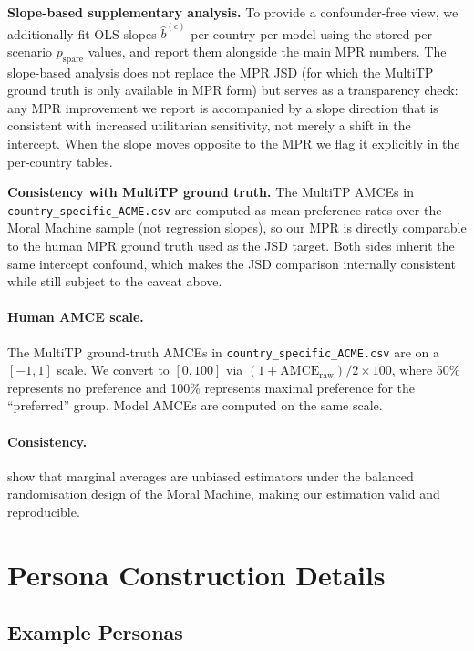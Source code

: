 \documentclass{article}
\begin{document}
\textbf{Slope-based supplementary analysis.}
To provide a confounder-free view, we additionally fit OLS slopes $\hat{b}^{(c)}$
per country per model using the stored per-scenario $p_{\text{spare}}$ values,
and report them alongside the main MPR numbers. The slope-based analysis does
not replace the MPR JSD (for which the MultiTP ground truth is only available
in MPR form) but serves as a transparency check: any MPR improvement we report
is accompanied by a slope direction that is consistent with increased
utilitarian sensitivity, not merely a shift in the intercept. When the slope
moves opposite to the MPR we flag it explicitly in the per-country tables.

\textbf{Consistency with MultiTP ground truth.} The MultiTP AMCEs in
\texttt{country\_specific\_ACME.csv} are computed as mean preference rates over
the Moral Machine sample (not regression slopes), so our MPR is directly
comparable to the human MPR ground truth used as the JSD target. Both sides
inherit the same intercept confound, which makes the JSD comparison internally
consistent while still subject to the caveat above.

\paragraph{Human AMCE scale.} The MultiTP ground-truth AMCEs in
\texttt{country\_specific\_ACME.csv} are on a $[-1, 1]$ scale. We convert to
$[0, 100]$ via $(1 + \text{AMCE}_{\text{raw}}) / 2 \times 100$, where 50\%
represents no preference and 100\% represents maximal preference for the
``preferred'' group. Model AMCEs are computed on the same scale.

\paragraph{Consistency.} \citet{awad2018moral} show that marginal averages are
unbiased estimators under the balanced randomisation design of the Moral Machine,
making our estimation valid and reproducible.

\section{Persona Construction Details}
\label{app:personas}

\subsection{Example Personas}
\end{document}

